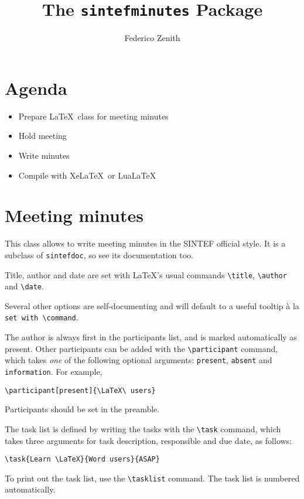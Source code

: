 \documentclass[unrestricted]{sintefminutes}
\title{The \texttt{sintefminutes} Package}
\author{Federico Zenith}
\begin{document}
\frontmatter

\section*{Agenda}
\begin{itemize}
  \item Prepare \LaTeX\ class for meeting minutes
  \item Hold meeting
  \item Write minutes
  \item Compile with Xe\LaTeX\ or Lua\LaTeX
\end{itemize}

\section*{Meeting minutes}
This class allows to write meeting minutes in the SINTEF official style.
It is a subclass of \texttt{sintefdoc}, so see its documentation too.

Title, author and date are set with \LaTeX's usual commands
\verb|\title|, \verb|\author| and \verb|\date|.

Several other options are self-documenting and will default to a useful
tooltip à la \texttt{set with \textbackslash command}.

The author is always first in the participants list, and is marked automatically
as present.
Other participants can be added with the \verb|\participant| command, which
takes \emph{one} of the following optional arguments: \verb|present|, \verb|absent|
and \verb|information|.
For example,
\begin{verbatim}
\participant[present]{\LaTeX\ users}
\end{verbatim}
Participants should be set in the preamble.

The task list is defined by writing the tasks with the \verb|\task| command, which
takes three arguments for task description, responsible and due date, as
follows:
\begin{verbatim}
\task{Learn \LaTeX}{Word users}{ASAP}
\end{verbatim}
To print out the task list, use the \verb|\tasklist| command.
The task list is numbered automatically.

\tasklist
\end{document}
